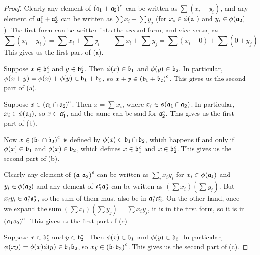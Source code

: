 \begin{proof}
    Clearly any element of \({(\mathfrak{a}_1+\mathfrak{a}_2)}^e\)
    can be written as \(\sum (x_i+y_i)\),
    and any element of \(\mathfrak{a}_1^e+\mathfrak{a}_2^e\)
    can be written as \(\sum x_i + \sum y_j\)
    (for \(x_i \in \phi(\mathfrak{a}_1)\) and \(y_i \in \phi(\mathfrak{a}_2)\)).
    The first form can be written into the second form,
    and vice versa, as
    \begin{equation*}
        \sum (x_i+y_i) = \sum x_i + \sum y_i \qquad
        \sum x_i + \sum y_j = \sum (x_i+0) + \sum (0+y_j)
    \end{equation*}
    This gives us the first part of (a).
    
    Suppose \(x \in \mathfrak{b}_1^c\) and \(y \in \mathfrak{b}_2^c\).
    Then \(\phi(x) \in \mathfrak{b}_1\) and \(\phi(y) \in \mathfrak{b}_2\).
    In particular, \(\phi(x+y) = \phi(x)+\phi(y) \in \mathfrak{b}_1+\mathfrak{b}_2\),
    so \(x+y \in {(\mathfrak{b}_1+\mathfrak{b}_2)}^c\).
    This gives us the second part of (a).
    
    \medskip
    
    Suppose \(x \in {(\mathfrak{a}_1\cap\mathfrak{a}_2)}^e\).
    Then \(x = \sum x_i\), where \(x_i \in \phi(\mathfrak{a}_1\cap\mathfrak{a}_2)\).
    In particular, \(x_i \in \phi(\mathfrak{a}_1)\), so \(x \in \mathfrak{a}_1^e\),
    and the same can be said for \(\mathfrak{a}_2^e\).
    This gives us the first part of (b).
    
    Now \(x \in {(\mathfrak{b}_1\cap\mathfrak{b}_2)}^c\)
    is defined by \(\phi(x) \in \mathfrak{b}_1\cap\mathfrak{b}_2\),
    which happens if and only if \(\phi(x) \in \mathfrak{b}_1\) and \(\phi(x) \in \mathfrak{b}_2\),
    which defines \(x \in \mathfrak{b}_1^c\) and \(x \in \mathfrak{b}_2^c\).
    This gives us the second part of (b).
    
    \medskip
    
    Clearly any element of \({(\mathfrak{a}_1\mathfrak{a}_2)}^e\)
    can be written as \(\sum_i x_i y_i\) for \(x_i \in \phi(\mathfrak{a}_1)\) and \(y_i \in \phi(\mathfrak{a}_2)\)
    and any element of \(\mathfrak{a}_1^e\mathfrak{a}_2^e\)
    can be written as \((\sum x_i)(\sum y_j)\).
    But \(x_i y_i \in \mathfrak{a}_1^e\mathfrak{a}_2^e\),
    so the sum of them must also be in \(\mathfrak{a}_1^e\mathfrak{a}_2^e\).
    On the other hand, once we expand the sum \((\sum x_i)(\sum y_j) = \sum x_i y_j\),
    it is in the first form, so it is in \({(\mathfrak{a}_1\mathfrak{a}_2)}^e\).
    This gives us the first part of (c).
    
    Suppose \(x \in \mathfrak{b}_1^c\) and \(y \in \mathfrak{b}_2^c\).
    Then \(\phi(x) \in \mathfrak{b}_1\) and \(\phi(y) \in \mathfrak{b}_2\).
    In particular, \(\phi(xy) = \phi(x)\phi(y) \in \mathfrak{b}_1\mathfrak{b}_2\),
    so \(xy \in {(\mathfrak{b}_1\mathfrak{b}_2)}^c\).
    This gives us the second part of (c).


\end{proof}
